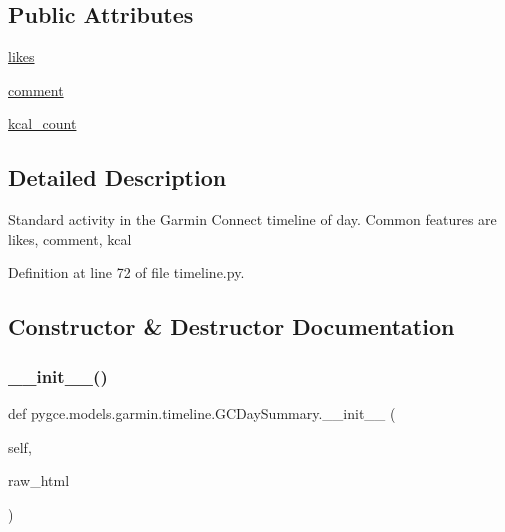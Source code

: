 \subsection*{Public Attributes}
\begin{DoxyCompactItemize}
\item 
\hyperlink{classpygce_1_1models_1_1garmin_1_1timeline_1_1_g_c_day_summary_a3fc863d92101994b0c2263b6f0cae4c4}{likes}
\item 
\hyperlink{classpygce_1_1models_1_1garmin_1_1timeline_1_1_g_c_day_summary_af38e9e07196f995d9e8551bb69940f3d}{comment}
\item 
\hyperlink{classpygce_1_1models_1_1garmin_1_1timeline_1_1_g_c_day_summary_a16ed8d554c0349a90d281cbd58608153}{kcal\+\_\+count}
\end{DoxyCompactItemize}


\subsection{Detailed Description}
\begin{DoxyVerb}Standard activity in the Garmin Connect timeline of day.
Common features are likes, comment, kcal
\end{DoxyVerb}
 

Definition at line 72 of file timeline.\+py.



\subsection{Constructor \& Destructor Documentation}
\mbox{\label{classpygce_1_1models_1_1garmin_1_1timeline_1_1_g_c_day_summary_a9af14ec017803981a9b6047877d92be7}} 
\subsubsection{\texorpdfstring{\+\_\+\+\_\+init\+\_\+\+\_\+()}{\_\_init\_\_()}}
{\footnotesize\ttfamily def pygce.\+models.\+garmin.\+timeline.\+G\+C\+Day\+Summary.\+\_\+\+\_\+init\+\_\+\+\_\+ (\begin{DoxyParamCaption}\item[{}]{self,  }\item[{}]{raw\+\_\+html }\end{DoxyParamCaption})}

